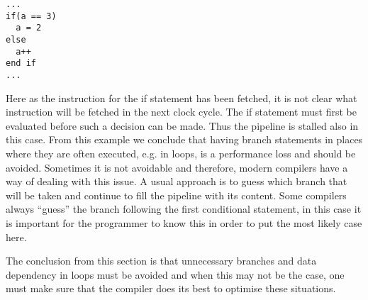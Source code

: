 \begin{verbatim}
...
if(a == 3)
  a = 2 
else
  a++
end if
...
\end{verbatim}
Here as the instruction for the if statement has been fetched, it is
not clear what instruction will be fetched in the next clock
cycle. The if statement must first be evaluated before such a decision
can be made. Thus the pipeline is stalled also in this case. From this
example we conclude that having branch statements in places where they
are often executed, e.g. in loops, is a performance loss and should be
avoided. Sometimes it is not avoidable and therefore, modern compilers
have a way of dealing with this issue. A usual approach is to guess
which branch that will be taken and continue to fill the pipeline with
its content. Some compilers always ``guess'' the branch following the
first conditional statement, in this case it is important for the
programmer to know this in order to put the most likely case
here. \cite{wiki-pipeline}

The conclusion from this section is that unnecessary branches and data
dependency in loops must be avoided and when this may not be the case,
one must make sure that the compiler does its best to optimise these
situations. 


